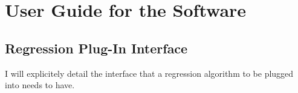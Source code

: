 \chapter{User Guide for the \fw Software}
\thispagestyle{plain}


\section{Regression Plug-In Interface}
\label{RegressionInterface}

I will explicitely detail the interface that a regression algorithm to be plugged into \fw needs to have.

